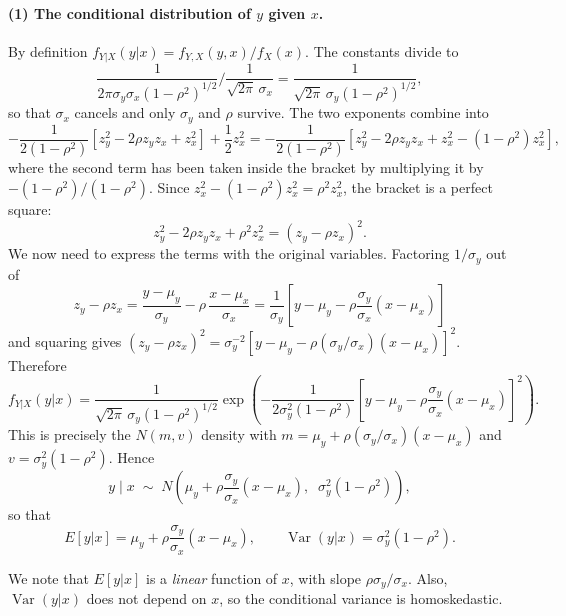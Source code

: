 \documentclass[11pt]{article}
\DeclareMathOperator{\Var}{Var}
\begin{document}
\paragraph{(1) The conditional distribution of $y$ given $x$.}
By definition $f_{Y|X}(y|x) = f_{Y,X}(y,x)/f_X(x)$. The constants divide to
\[
\frac{1}{2\pi\sigma_y\sigma_x(1-\rho^2)^{1/2}}
\Bigg/ \frac{1}{\sqrt{2\pi}\,\sigma_x}
= \frac{1}{\sqrt{2\pi}\,\sigma_y(1-\rho^2)^{1/2}},
\]
so that $\sigma_x$ cancels and only $\sigma_y$ and $\rho$ survive. The two
exponents combine into
\[
-\frac{1}{2(1-\rho^2)}\left[z_y^2 - 2\rho z_y z_x + z_x^2\right]
+ \frac{1}{2}z_x^2
= -\frac{1}{2(1-\rho^2)}
  \left[z_y^2 - 2\rho z_y z_x + z_x^2 - (1-\rho^2)z_x^2\right],
\]
where the second term has been taken inside the bracket by multiplying it by
$-(1-\rho^2)/(1-\rho^2)$. Since $z_x^2 - (1-\rho^2)z_x^2 = \rho^2 z_x^2$, the
bracket is a perfect square:
\[
z_y^2 - 2\rho z_y z_x + \rho^2 z_x^2 = \left(z_y - \rho z_x\right)^2 .
\]
We now need to express the terms with the original variables. Factoring $1/\sigma_y$ out of
\[
z_y - \rho z_x
= \frac{y-\mu_y}{\sigma_y} - \rho\,\frac{x-\mu_x}{\sigma_x}
= \frac{1}{\sigma_y}
  \left[y - \mu_y - \rho\frac{\sigma_y}{\sigma_x}(x-\mu_x)\right]
\]
and squaring gives
$(z_y-\rho z_x)^2 = \sigma_y^{-2}
[y-\mu_y-\rho(\sigma_y/\sigma_x)(x-\mu_x)]^2$. Therefore
\[
f_{Y|X}(y|x) = \frac{1}{\sqrt{2\pi}\,\sigma_y(1-\rho^2)^{1/2}}
  \exp\!\left(-\frac{1}{2\sigma_y^2(1-\rho^2)}
  \left[y - \mu_y - \rho\frac{\sigma_y}{\sigma_x}(x-\mu_x)\right]^2\right).
\]
This is precisely the $N(m,v)$ density with $m = \mu_y +
\rho(\sigma_y/\sigma_x)(x-\mu_x)$ and $v = \sigma_y^2(1-\rho^2)$. Hence
\[
y \mid x \;\sim\; N\!\left(\mu_y + \rho\frac{\sigma_y}{\sigma_x}(x-\mu_x),
\;\; \sigma_y^2(1-\rho^2)\right),
\]
so that
\[
E[y|x] = \mu_y + \rho\frac{\sigma_y}{\sigma_x}(x-\mu_x),
\qquad
\Var(y|x) = \sigma_y^2(1-\rho^2).
\]

We note that $E[y|x]$ is a \emph{linear} function of $x$, with slope $\rho\sigma_y/\sigma_x$. Also, $\Var(y|x)$ does not depend on $x$, so the conditional variance is
homoskedastic.
\end{document}

